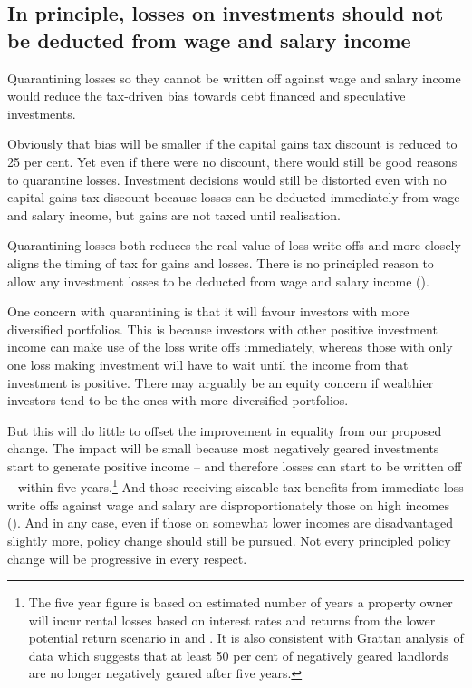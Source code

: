 \subsection{In principle, losses on investments should not be deducted from wage and salary income}\label{subsec:In-principle-losses-should-not-be-deducted-from-salary}
Quarantining losses so they cannot be written off against wage and salary income would reduce the tax-driven bias towards debt financed and speculative investments. 

Obviously that bias will be smaller if the capital gains tax discount is reduced to 25 per cent. 
Yet even if there were no discount, there would still be good reasons to quarantine losses. Investment decisions would still be distorted even with no capital gains tax discount because losses can be deducted immediately from wage and salary income, but gains are not taxed until realisation.

Quarantining losses both reduces the real value of loss write-offs and more closely aligns the timing of tax for gains and losses. There is no principled reason to allow any investment losses to be deducted from wage and salary income (). 

One concern with quarantining is that it will favour investors with more diversified portfolios. This is because investors with other positive investment income can make use of the loss write offs immediately, whereas those with only one loss making investment will have to wait until the income from that investment is positive. There may arguably be an equity concern if wealthier investors tend to be the ones with more diversified portfolios. 

But this will do little to offset the improvement in equality from our proposed change. 
The impact will be small because most negatively geared investments start to generate positive income – and therefore losses can start to be written off – within five years.\footnote{The five year figure\label{footnote:number-years-for-NG} is based on estimated number of years a property owner will incur rental losses based on interest rates and returns from the lower potential return scenario in  and . It is also consistent with Grattan analysis of \textcite{HILDA2015} data which suggests that at least 50 per cent of negatively geared landlords are no longer negatively geared after five years. }  
And those receiving sizeable tax benefits from immediate loss write offs against wage and salary are disproportionately those on high incomes (). 
And in any case, even if those on somewhat lower incomes are disadvantaged slightly more, policy change should still be pursued. Not every principled policy change will be progressive in every respect.

